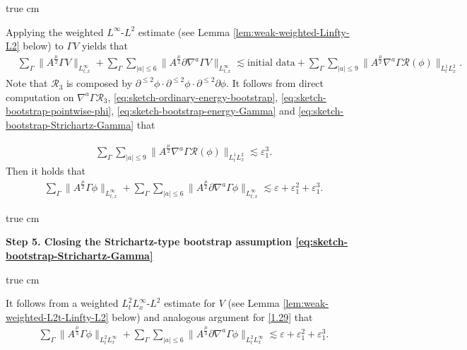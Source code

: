 \documentclass[11pt,twoside]{article}
\def\p{\partial}
\def\ls{\lesssim}
\theoremstyle{plain}
\theoremstyle{definition}
\theoremstyle{assumption}
\numberwithin{equation}{section}
\begin{document}
 true cm

Applying the weighted \(L^\infty\)-\(L^2\) estimate (see Lemma \ref{lem:weak-weighted-Linfty-L2} below)
to \(\Gamma V\) yields that
		\begin{equation}\label{1.29}
		\begin{aligned}
			&\sum_{\Gamma}\big\|A^{\frac{\mu}{2}}\Gamma V
			\big\|_{L^\infty_{t,x}}
			+\sum_{\Gamma}\sum_{|a|\le 6}
			\big\|A^{\frac{\mu}{2}}\p\nabla^a\Gamma V\big\|_{L^\infty_{t,x}}
			\ls \text{initial data}
			+\sum_{\Gamma}
			\sum_{|a|\le 9}
			\big\|
			A^{\frac{\mu}{2}}
			\nabla^a\Gamma\mathcal R(\phi)
			\big\|_{L^1_tL^2_x}.
		\end{aligned}
	\end{equation}
	Note that $\mathcal R_3$ is composed by $\partial^{\le2}\phi\cdot
	\partial^{\le2}\phi\cdot
	\partial^{\le2}\partial\phi$.
	It follows from direct computation on $\nabla^a\Gamma\mathcal R_3$, \eqref{eq:sketch-ordinary-energy-bootstrap}, \eqref{eq:sketch-bootstrap-pointwise-phi}, \eqref{eq:sketch-bootstrap-energy-Gamma}
and \eqref{eq:sketch-bootstrap-Strichartz-Gamma} that

\begin{equation}\label{YHC-11}
	\begin{aligned}
\sum_{\Gamma}
			\sum_{|a|\le 9}
			\big\|
			A^{\frac{\mu}{2}}
			\nabla^a\Gamma\mathcal R(\phi)
			\big\|_{L^1_tL^2_x}	
			\lesssim
	\varepsilon_1^3.
	\end{aligned}
	\end{equation}
Then it holds that
\begin{equation}\label{YHC-12}
	\begin{aligned}
	\sum_{\Gamma}
	\big\|
	A^{\frac{\mu}{2}}\Gamma\phi
	\big\|_{L^\infty_{t,x}}
	+\sum_{\Gamma}
	\sum_{|a|\le 6}
	\big\|
	A^{\frac{\mu}{2}}\partial\nabla^a\Gamma\phi
	\big\|_{L^\infty_{t,x}}
	\ls
	\varepsilon+\varepsilon_1^2+\varepsilon_1^3.
	\end{aligned}
	\end{equation}

 true cm

{\bf Step 5. Closing the Strichartz-type bootstrap assumption \eqref{eq:sketch-bootstrap-Strichartz-Gamma}}

  true cm

 It follows from a weighted \(L^2_tL^\infty_x\)-\(L^2\) estimate for $V$ (see Lemma \ref{lem:weak-weighted-L2t-Linfty-L2} below) and analogous argument for \eqref{1.29}
that
\begin{equation}\label{YHC-13}
\begin{aligned}
\sum_{\Gamma}
\big\|A^{\frac{\mu}{3}}\Gamma\phi
\big\|_{L^2_tL^\infty_x}
+\sum_{\Gamma}\sum_{|a|\le 6}
\big\|	A^{\frac{\mu}{3}}\partial\nabla^a\Gamma\phi
\big\|_{L^2_tL^\infty_x}
\lesssim
\varepsilon+\varepsilon_1^2+\varepsilon_1^3.
\end{aligned}
\end{equation}
\end{document}
